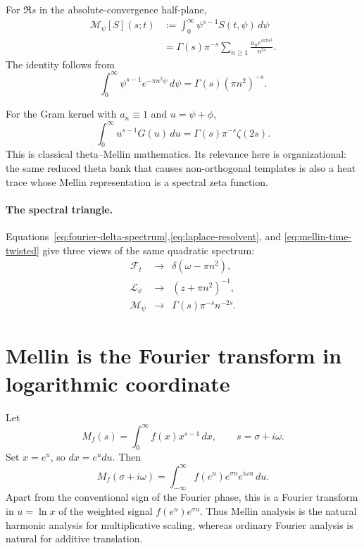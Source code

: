 For $\Re s$ in the absolute-convergence half-plane,
\begin{align}
  \mathcal M_\psi[S](s;t)
  &:=\int_0^\infty \psi^{s-1}S(t,\psi)\,d\psi \\
  &=\Gamma(s)\pi^{-s}
    \sum_{n\ge1}\frac{a_n e^{i\pi t n^2}}{n^{2s}}.
  \label{eq:mellin-time-twisted}
\end{align}
The identity follows from
\begin{equation}
 \int_0^\infty \psi^{s-1}e^{-\pi n^2\psi}\,d\psi
 =\Gamma(s)(\pi n^2)^{-s}.
\end{equation}

For the Gram kernel with $a_n\equiv1$ and $u=\psi+\phi$,
\begin{equation}
 \int_0^\infty u^{s-1}G(u)\,du
 =\Gamma(s)\pi^{-s}\zeta(2s).
 \label{eq:gram-mellin-zeta}
\end{equation}
This is classical theta--Mellin mathematics.  Its relevance here is organizational:
the same reduced theta bank that causes non-orthogonal templates is also a heat trace
whose Mellin representation is a spectral zeta function.

\paragraph{The spectral triangle.}
Equations~\eqref{eq:fourier-delta-spectrum},\eqref{eq:laplace-resolvent}, and
\eqref{eq:mellin-time-twisted} give three views of the same quadratic spectrum:
\begin{equation}
 \boxed{
 \begin{array}{ccl}
   \mathcal F_t   &\longrightarrow& \delta(\omega-\pi n^2),\\[2mm]
   \mathcal L_\psi&\longrightarrow& (z+\pi n^2)^{-1},\\[2mm]
   \mathcal M_\psi&\longrightarrow& \Gamma(s)\pi^{-s}n^{-2s}.
 \end{array}}
 \label{eq:spectral-triangle}
\end{equation}

\section{Mellin is the Fourier transform in logarithmic coordinate}

Let
\begin{equation}
  M_f(s)=\int_0^\infty f(x)x^{s-1}\,dx,
  \qquad s=\sigma+i\omega.
\end{equation}
Set $x=e^u$, so $dx=e^u du$.  Then
\begin{equation}
  M_f(\sigma+i\omega)
  =\int_{-\infty}^{\infty}
   f(e^u)e^{\sigma u}e^{i\omega u}\,du.
  \label{eq:mellin-log-fourier}
\end{equation}
Apart from the conventional sign of the Fourier phase, this is a Fourier transform in
$u=\ln x$ of the weighted signal $f(e^u)e^{\sigma u}$.  Thus Mellin analysis is the
natural harmonic analysis for multiplicative scaling, whereas ordinary Fourier analysis
is natural for additive translation.

